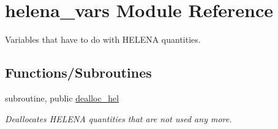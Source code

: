 \hypertarget{namespacehelena__vars}{}\section{helena\+\_\+vars Module Reference}
\label{namespacehelena__vars}


Variables that have to do with H\+E\+L\+E\+NA quantities.  


\subsection*{Functions/\+Subroutines}
\begin{DoxyCompactItemize}
\item 
subroutine, public \hyperlink{namespacehelena__vars_add7b3eea7306eca7fb45737ff915523f}{dealloc\+\_\+hel}
\begin{DoxyCompactList}\small\item\em Deallocates H\+E\+L\+E\+NA quantities that are not used any more. \end{DoxyCompactList}\end{DoxyCompactItemize}
